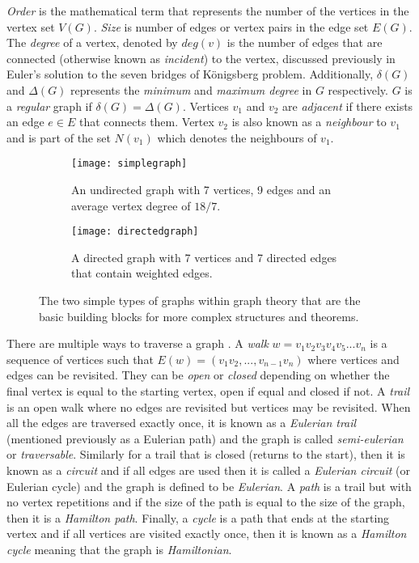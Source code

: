 \emph{Order} is the mathematical term that represents the number of the vertices in the vertex set $V(G)$. \emph{Size} is number of edges or vertex pairs in the edge set $E(G)$. The \emph{degree} of a vertex, denoted by $deg(v)$ is the number of edges that are connected (otherwise known as \emph{incident}) to the vertex, discussed previously in Euler's solution to the seven bridges of Königsberg problem. Additionally, $\delta(G)$ and $\Delta(G)$ represents the \emph{minimum} and \emph{maximum degree} in $G$ respectively. $G$ is a \emph{regular} graph if $\delta(G) = \Delta(G)$. Vertices $v_{1}$ and $v_{2}$ are \emph{adjacent} if there exists an edge $e \in E$ that connects them. Vertex $v_{2}$ is also known as a \emph{neighbour} to $v_{1}$ and is part of the set $N(v_{1})$ which denotes the neighbours of $v_{1}$. 
\newline

\begin{figure}[!htb]
\centering
\begin{subfigure}{.45\textwidth}
	\texttt{[image: simplegraph]}
	\caption{An undirected graph with 7 vertices, 9 edges and an average vertex degree of $18/7$.}
	\label{fig:Simple Graph}
\end{subfigure}
\hfill
\begin{subfigure}{.45\textwidth}
	\texttt{[image: directedgraph]}
	\caption{A directed graph with 7 vertices and 7 directed edges that contain weighted edges.}
	\label{fig:Directed Graph}
\end{subfigure}
\caption{The two simple types of graphs within graph theory that are the basic building blocks for more complex structures and theorems.}
\end{figure}

There are multiple ways to traverse a graph \cite{rahman2017basic}. A \emph{walk} $w = v_1v_2v_3v_4v_5...v_n$ is a sequence of vertices such that $E(w) = (v_1v_2,...,v_{n-1}v_n)$ where vertices and edges can be revisited. They can be \emph{open} or \emph{closed} depending on whether the final vertex is equal to the starting vertex, open if equal and closed if not. A \emph{trail} is an open walk where no edges are revisited but vertices may be revisited. When all the edges are traversed exactly once, it is known as a \emph{Eulerian trail} (mentioned previously as a Eulerian path) and the graph is called \emph{semi-eulerian} or \emph{traversable}. Similarly for a trail that is closed (returns to the start), then it is known as a \emph{circuit} and if all edges are used then it is called a \emph{Eulerian circuit} (or Eulerian cycle) and the graph is defined to be \emph{Eulerian}. A \emph{path} is a trail but with no vertex repetitions and if the size of the path is equal to the size of the graph, then it is a \emph{Hamilton path}. Finally, a \emph{cycle} is a path that ends at the starting vertex and if all vertices are visited exactly once, then it is known as a \emph{Hamilton cycle} meaning that the graph is \emph{Hamiltonian}.
\newline

